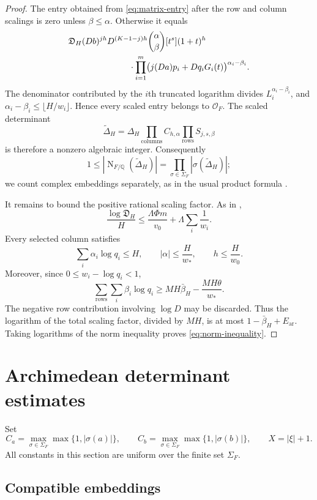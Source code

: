 \documentclass[11pt]{article}
\newcommand{\QQ}{\mathbb Q}
\newcommand{\OO}{\mathcal O}
\DeclareMathOperator{\Nm}{N}
\theoremstyle{definition}
\theoremstyle{remark}
\numberwithin{equation}{section}
\begin{document}
\begin{proof}
The entry obtained from \eqref{eq:matrix-entry} after the row and column
scalings is zero unless $\beta\le\alpha$.  Otherwise it equals
\begin{align*}
 &\mathfrak D_H(Db)^{jh}D^{(K-1-j)h}
 \binom\alpha\beta[t^s](1+t)^h\\
 &\hspace{25mm}\cdot
 \prod_{i=1}^m
 \bigl(j(Da)p_i+Dq_iG_i(t)\bigr)^{\alpha_i-\beta_i}.
\end{align*}
The denominator contributed by the $i$th truncated logarithm divides
$L_i^{\alpha_i-\beta_i}$, and
$\alpha_i-\beta_i\le\lfloor H/w_i\rfloor$.  Hence every scaled entry
belongs to $\OO_F$.  The scaled determinant
\[
 \widetilde\Delta_H
 =\Delta_H\prod_{\text{columns}}C_{h,\alpha}
             \prod_{\text{rows}}S_{j,s,\beta}
\]
is therefore a nonzero algebraic integer.  Consequently
\[
 1\le|\Nm_{F/\QQ}(\widetilde\Delta_H)|
 =\prod_{\sigma\in\Sigma_F}|\sigma(\widetilde\Delta_H)|;
\]
we count complex embeddings separately, as in the usual product formula
\cite[Chapter~I]{Neukirch1999}.

It remains to bound the positive rational scaling factor.  As in
\cite[Section~4]{LiuJiangZhang2026},
\[
 \frac{\log\mathfrak D_H}{H}
 \le\frac{\Lambda\Phi m}{v_0}
    +\Lambda\sum_i\frac1{w_i}.
\]
Every selected column satisfies
\[
 \sum_i\alpha_i\log q_i\le H,
 \qquad |\alpha|\le\frac H{w_*},
 \qquad h\le\frac H{w_0}.
\]
Moreover, since $0\le w_i-\log q_i<1$,
\[
 \sum_{\text{rows}}\sum_i\beta_i\log q_i
 \ge MH\bar\beta_H-\frac{MH\theta}{w_*}.
\]
The negative row contribution involving $\log D$ may be discarded.
Thus the logarithm of the total scaling factor, divided by $MH$, is at
most $1-\bar\beta_H+E_{\mathrm{ar}}$.  Taking logarithms of the norm
inequality proves \eqref{eq:norm-inequality}.
\end{proof}

\section{Archimedean determinant estimates}\label{sec:analytic}

Set
\[
 C_a=\max_{\sigma\in\Sigma_F}\max\{1,|\sigma(a)|\},
 \qquad
 C_b=\max_{\sigma\in\Sigma_F}\max\{1,|\sigma(b)|\},
 \qquad X=|\xi|+1.
\]
All constants in this section are uniform over the finite set
$\Sigma_F$.

\subsection{Compatible embeddings}
\end{document}

